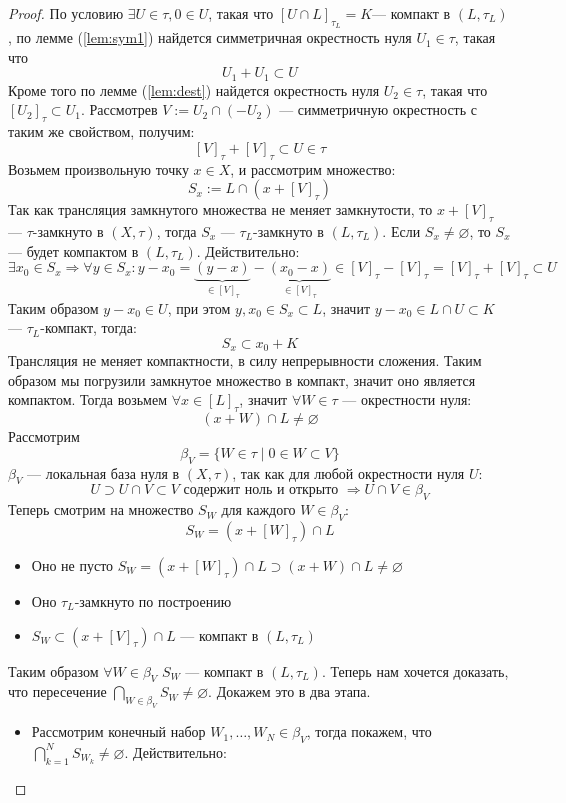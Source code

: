 \begin{proof}
	По условию $\exists U \in \tau, 0 \in U$, такая что $[U \cap L]_{\tau_L} = K$--- компакт в $(L, \tau_L)$, по лемме (\ref{lem:sym1}) найдется симметричная окрестность нуля $U_1 \in \tau$, такая что
	$$
	U_1 + U_1 \subset U
	$$
	Кроме того по лемме (\ref{lem:dest}) найдется окрестность нуля $U_2 \in \tau$, такая что $[U_2]_\tau \subset U_1$. Рассмотрев $V:= U_2\cap (-U_2)$ --- симметричную окрестность с таким же свойством, получим:
	$$
	[V]_\tau + [V]_\tau \subset U \in \tau
	$$
	Возьмем произвольную точку $x \in X$, и рассмотрим множество:
	$$
	S_x := L \cap (x + [V]_\tau)
	$$
	Так как трансляция замкнутого множества не меняет замкнутости, то $x + [V]_\tau$ --- $\tau$-замкнуто в $(X, \tau)$, тогда $S_x$ --- $\tau_L$-замкнуто в $(L, \tau_L)$. Если $S_x \neq \varnothing$, то $S_x$ --- будет компактом в $(L, \tau_L)$. Действительно:
	$$
	\exists x_0 \in S_x \Rightarrow \forall y \in S_x: y - x_0 = \underbrace{(y-x)}_{\in [V]_\tau} - \underbrace{(x_0-x)}_{\in [V]_\tau}\in [V]_\tau - [V]_\tau = [V]_\tau + [V]_\tau \subset U
	$$
	Таким образом $y - x_0 \in U$,  при этом $y,x_0 \in S_x \subset L$, значит $y- x_0 \in L\cap U \subset K$ --- $\tau_L$-компакт,  тогда:
	$$
	S_x \subset x_0 + K
	$$
	Трансляция не меняет компактности, в силу непрерывности сложения. Таким образом мы погрузили замкнутое множество в компакт, значит оно является компактом.
	Тогда возьмем $\forall x \in [L]_\tau$, значит $\forall W \in \tau$ --- окрестности нуля:
	$$
	(x + W)\cap L \neq \varnothing
	$$
	Рассмотрим 
	$$
	\beta_V = \{W \in \tau \mid 0 \in W\subset V\}
	$$
	$\beta_V$ --- локальная база нуля в $(X, \tau)$, так как для любой окрестности нуля $U$:
	$$
	U \supset U \cap V \subset V  \text{ содержит ноль и открыто } \Rightarrow  U \cap V \in \beta_V
	$$
	Теперь смотрим на множество $S_W$ для каждого $W \in \beta_V$:
	$$
	S_W = (x + [W]_\tau)\cap L 
	$$ 
	\begin{itemize}
		\item Оно не пусто $ S_W = (x + [W]_\tau)\cap L \supset (x+ W)\cap L \neq \varnothing$
		\item Оно $\tau_L$-замкнуто по построению 
		\item $S_W \subset (x + [V]_\tau)\cap L$ --- компакт в $(L, \tau_L)$
	\end{itemize}
	Таким образом $\forall W \in \beta_V$ $S_W$ --- компакт в $(L, \tau_L)$. Теперь нам хочется доказать, что пересечение $\bigcap_{W \in \beta_V}S_W \neq \varnothing$. Докажем это в два этапа.
	\begin{itemize}
		\item Рассмотрим конечный набор $W_1, \dots, W_N \in \beta_V$, тогда покажем, что $\bigcap_{k=1}^N S_{W_k} \neq \varnothing$. Действительно:

\end{itemize}
\end{proof}

